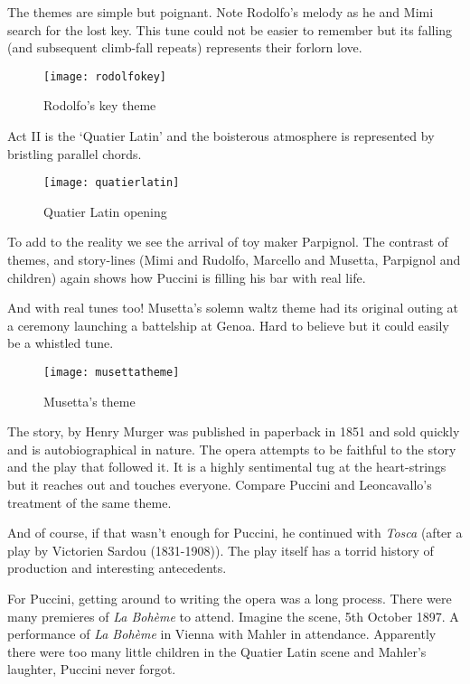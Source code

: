 The themes are simple but poignant. Note Rodolfo's melody as he and Mimi search for the lost key. This tune could not be easier to remember but its falling (and subsequent climb-fall repeats) represents their forlorn love. 

\begin{figure}[H]
\centering
\texttt{[image: rodolfokey]}\caption{Rodolfo's key theme}
\label{fig:rodolfokey}
\end{figure}

Act II is the `Quatier Latin' and the boisterous atmosphere is represented by bristling parallel chords. 

\begin{figure}[H]
\centering
\texttt{[image: quatierlatin]}\caption{Quatier Latin opening}
\label{fig:quatierlatin}
\end{figure}

To add to the reality we see the arrival of toy maker Parpignol. The contrast of themes, and story-lines (Mimi and Rudolfo, Marcello and Musetta, Parpignol and children) again shows how Puccini is filling his bar with real life.

And with real tunes too! Musetta's solemn waltz theme had its original outing at a ceremony launching a battelship at Genoa. Hard to believe but it could easily be a whistled tune. 

\begin{figure}[H]
\centering
\texttt{[image: musettatheme]}\caption{Musetta's theme}
\label{fig:musettatheme}
\end{figure}

The story, by Henry Murger was published in paperback in 1851 and sold quickly and is autobiographical in nature. The opera attempts to be faithful to the story and the play that followed it. It is a highly sentimental tug at the heart-strings but it reaches out and touches everyone. Compare Puccini and Leoncavallo's treatment of the same theme. 

And of course, if that wasn't enough for Puccini, he continued with \textit{Tosca} (after a play by Victorien Sardou (1831-1908)). The play itself has a torrid history of production and interesting antecedents.

For Puccini, getting around to writing the opera was a long process. There were many premieres of \textit{La Boh\`eme} to attend. Imagine the scene, 5th October 1897. A performance of \textit{La Boh\`eme} in Vienna with Mahler in attendance. Apparently there were too many little children in the Quatier Latin scene and Mahler's laughter, Puccini never forgot.   

